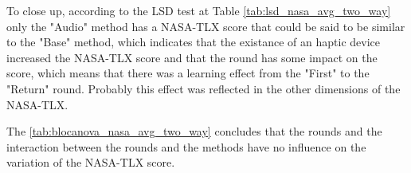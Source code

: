 
%

To close up, according to the LSD test at Table \ref{tab:lsd_nasa_avg_two_way} only the "Audio" method has a NASA-TLX score that could be said to be similar to the "Base" method, which indicates that the existance of an haptic device increased the NASA-TLX score and that the round has some impact on the score, which means that there was a learning effect from the "First" to the "Return" round. Probably this effect was reflected in the other dimensions of the NASA-TLX.

The \ref{tab:blocanova_nasa_avg_two_way} concludes that the rounds and the interaction between the rounds and the methods have no influence on the variation of the NASA-TLX score.

\FloatBarrier